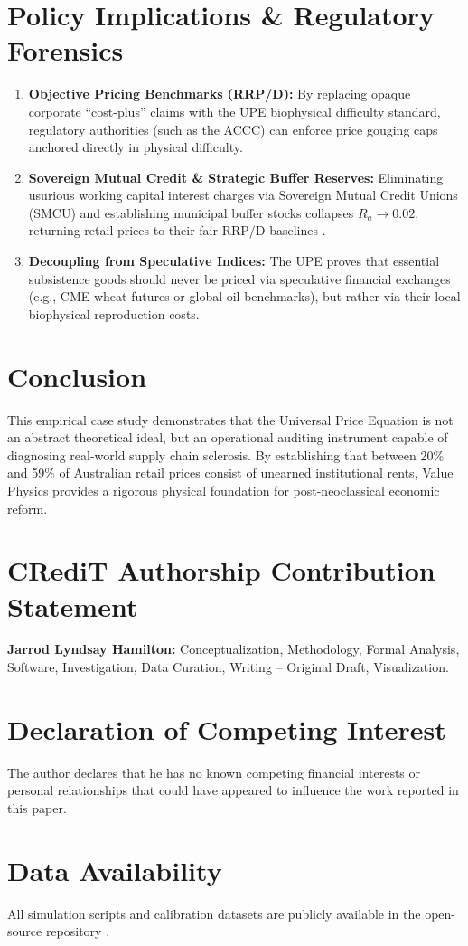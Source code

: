 \documentclass[preprint,12pt,authoryear]{elsarticle}
\begin{document}
\section{Policy Implications \& Regulatory Forensics}
\begin{enumerate}
    \item \textbf{Objective Pricing Benchmarks (RRP/D):} By replacing opaque corporate ``cost-plus'' claims with the UPE biophysical difficulty standard, regulatory authorities (such as the ACCC) can enforce price gouging caps anchored directly in physical difficulty.
    \item \textbf{Sovereign Mutual Credit \& Strategic Buffer Reserves:} Eliminating usurious working capital interest charges via Sovereign Mutual Credit Unions (SMCU) and establishing municipal buffer stocks collapses $R_a \to 0.02$, returning retail prices to their fair RRP/D baselines \citep{godley2007monetary, hamilton2026vpe49}.
    \item \textbf{Decoupling from Speculative Indices:} The UPE proves that essential subsistence goods should never be priced via speculative financial exchanges (e.g., CME wheat futures or global oil benchmarks), but rather via their local biophysical reproduction costs.
\end{enumerate}

\section{Conclusion}
This empirical case study demonstrates that the Universal Price Equation is not an abstract theoretical ideal, but an operational auditing instrument capable of diagnosing real-world supply chain sclerosis. By establishing that between 20\% and 59\% of Australian retail prices consist of unearned institutional rents, Value Physics provides a rigorous physical foundation for post-neoclassical economic reform.

\section*{CRediT Authorship Contribution Statement}
\textbf{Jarrod Lyndsay Hamilton:} Conceptualization, Methodology, Formal Analysis, Software, Investigation, Data Curation, Writing -- Original Draft, Visualization.

\section*{Declaration of Competing Interest}
The author declares that he has no known competing financial interests or personal relationships that could have appeared to influence the work reported in this paper.

\section*{Data Availability}
All simulation scripts and calibration datasets are publicly available in the open-source repository \citep{hamilton2026vpe49}.



\end{document}
